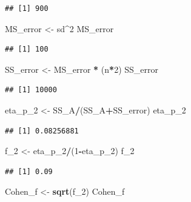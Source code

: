 \documentclass[]{book}
\newenvironment{Shaded}{\begin{snugshade}}{\end{snugshade}}
\newcommand{\DecValTok}[1]{\textcolor[rgb]{0.00,0.00,0.81}{#1}}
\newcommand{\KeywordTok}[1]{\textcolor[rgb]{0.13,0.29,0.53}{\textbf{#1}}}
\newcommand{\NormalTok}[1]{#1}
\newcommand{\OperatorTok}[1]{\textcolor[rgb]{0.81,0.36,0.00}{\textbf{#1}}}
\newcommand{\StringTok}[1]{\textcolor[rgb]{0.31,0.60,0.02}{#1}}
\begin{document}
\begin{verbatim}
## [1] 900
\end{verbatim}

\begin{Shaded}
\begin{Highlighting}[]
\NormalTok{MS_error <-}\StringTok{ }\NormalTok{sd}\OperatorTok{^}\DecValTok{2}
\NormalTok{MS_error}
\end{Highlighting}
\end{Shaded}

\begin{verbatim}
## [1] 100
\end{verbatim}

\begin{Shaded}
\begin{Highlighting}[]
\NormalTok{SS_error <-}\StringTok{ }\NormalTok{MS_error }\OperatorTok{*}\StringTok{ }\NormalTok{(n}\OperatorTok{*}\DecValTok{2}\NormalTok{) }
\NormalTok{SS_error}
\end{Highlighting}
\end{Shaded}

\begin{verbatim}
## [1] 10000
\end{verbatim}

\begin{Shaded}
\begin{Highlighting}[]
\NormalTok{eta_p_}\DecValTok{2}\NormalTok{ <-}\StringTok{ }\NormalTok{SS_A}\OperatorTok{/}\NormalTok{(SS_A}\OperatorTok{+}\NormalTok{SS_error)}
\NormalTok{eta_p_}\DecValTok{2}
\end{Highlighting}
\end{Shaded}

\begin{verbatim}
## [1] 0.08256881
\end{verbatim}

\begin{Shaded}
\begin{Highlighting}[]
\NormalTok{f_}\DecValTok{2}\NormalTok{ <-}\StringTok{ }\NormalTok{eta_p_}\DecValTok{2}\OperatorTok{/}\NormalTok{(}\DecValTok{1}\OperatorTok{-}\NormalTok{eta_p_}\DecValTok{2}\NormalTok{)}
\NormalTok{f_}\DecValTok{2}
\end{Highlighting}
\end{Shaded}

\begin{verbatim}
## [1] 0.09
\end{verbatim}

\begin{Shaded}
\begin{Highlighting}[]
\NormalTok{Cohen_f <-}\StringTok{ }\KeywordTok{sqrt}\NormalTok{(f_}\DecValTok{2}\NormalTok{)}
\NormalTok{Cohen_f}
\end{Highlighting}
\end{Shaded}
\end{document}
